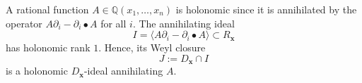 \documentclass[sigconf, nonacm]{acmart} %
\begin{document}
\begin{example}\label{eg:rational-holonomic}
    A rational function $A \in \mathbb{Q}(x_1,\ldots, x_n)$ is holonomic since it is annihilated by the operator $A \partial _i - \partial_i \bullet A $ for all $i$. The annihilating ideal 
    \begin{equation}\label{eg:holonomic}
        I = \langle A \partial _i - \partial_i \bullet A \rangle \subset R_{\mathbf{x}}
    \end{equation}
    has holonomic rank $1$. Hence, its Weyl closure 
    \begin{equation}
        J := D_{\mathbf{x}} \cap I
    \end{equation}
    is a holonomic $D_\mathbf{x}$-ideal annihilating $A$.
\end{example}
\end{document}
